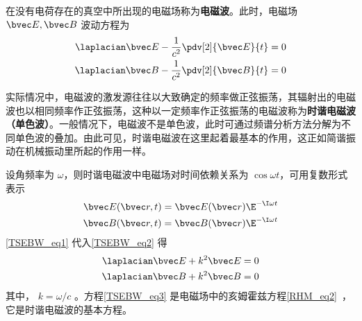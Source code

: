 
在没有电荷存在的真空中所出现的电磁场称为\textbf{电磁波}。此时，电磁场 $\bvec E,\bvec B$ 波动方程为
\begin{equation}\label{TSEBW_eq2}
\begin{aligned}
\laplacian\bvec E-\frac{1}{c^2}\pdv[2]{\bvec E}{t}=0\\
\laplacian\bvec B-\frac{1}{c^2}\pdv[2]{\bvec B}{t}=0
\end{aligned}
\end{equation}

实际情况中，电磁波的激发源往往以大致确定的频率做正弦振荡，其辐射出的电磁波也以相同频率作正弦振荡，这种以一定频率作正弦振荡的电磁波称为\textbf{时谐电磁波（单色波）}。一般情况下，电磁波不是单色波，此时可通过频谱分析方法分解为不同单色波的叠加。由此可见，时谐电磁波在这里起着最基本的作用，这正如简谐振动在机械振动里所起的作用一样。

设角频率为 $\omega$，则时谐电磁波中电磁场对时间依赖关系为 $\cos\omega t$，可用复数形式表示
\begin{equation}\label{TSEBW_eq1}
\begin{aligned}
\bvec E(\bvec r,t)=\bvec E(\bvec r)\E^{-\I\omega t}\\
\bvec B(\bvec r,t)=\bvec B(\bvec r)\E^{-\I\omega t}
\end{aligned}
\end{equation}
\autoref{TSEBW_eq1} 代入\autoref{TSEBW_eq2} 得
\begin{equation}\label{TSEBW_eq3}
\begin{aligned}
\laplacian\bvec E+k^2\bvec E=0\\
\laplacian\bvec B+k^2\bvec B=0
\end{aligned}
\end{equation}
其中， $k=\omega/c$ 。方程\autoref{TSEBW_eq3} 是电磁场中的亥姆霍兹方程\autoref{RHM_eq2}~，它是时谐电磁波的基本方程。